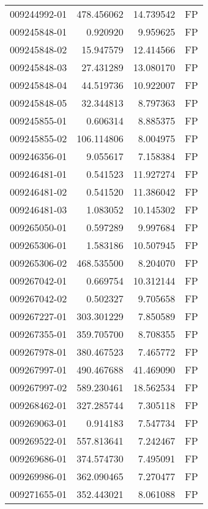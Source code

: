 \begin{tabular}{lrrl}
009244992-01 &  478.456062 &      14.739542 &   FP \\
009245848-01 &    0.920920 &       9.959625 &   FP \\
009245848-02 &   15.947579 &      12.414566 &   FP \\
009245848-03 &   27.431289 &      13.080170 &   FP \\
009245848-04 &   44.519736 &      10.922007 &   FP \\
009245848-05 &   32.344813 &       8.797363 &   FP \\
009245855-01 &    0.606314 &       8.885375 &   FP \\
009245855-02 &  106.114806 &       8.004975 &   FP \\
009246356-01 &    9.055617 &       7.158384 &   FP \\
009246481-01 &    0.541523 &      11.927274 &   FP \\
009246481-02 &    0.541520 &      11.386042 &   FP \\
009246481-03 &    1.083052 &      10.145302 &   FP \\
009265050-01 &    0.597289 &       9.997684 &   FP \\
009265306-01 &    1.583186 &      10.507945 &   FP \\
009265306-02 &  468.535500 &       8.204070 &   FP \\
009267042-01 &    0.669754 &      10.312144 &   FP \\
009267042-02 &    0.502327 &       9.705658 &   FP \\
009267227-01 &  303.301229 &       7.850589 &   FP \\
009267355-01 &  359.705700 &       8.708355 &   FP \\
009267978-01 &  380.467523 &       7.465772 &   FP \\
009267997-01 &  490.467688 &      41.469090 &   FP \\
009267997-02 &  589.230461 &      18.562534 &   FP \\
009268462-01 &  327.285744 &       7.305118 &   FP \\
009269063-01 &    0.914183 &       7.547734 &   FP \\
009269522-01 &  557.813641 &       7.242467 &   FP \\
009269686-01 &  374.574730 &       7.495091 &   FP \\
009269986-01 &  362.090465 &       7.270477 &   FP \\
009271655-01 &  352.443021 &       8.061088 &   FP \\

\end{tabular}
